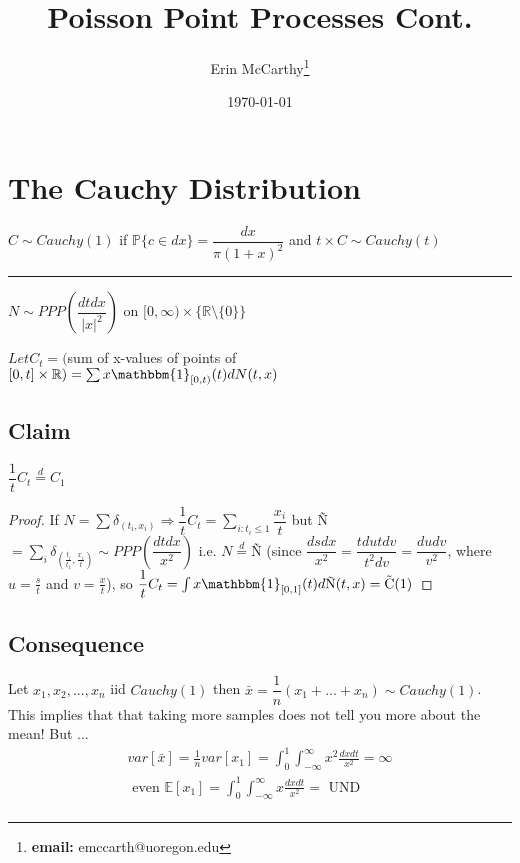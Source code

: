 \documentclass[12pt]{article}
\title{Poisson Point Processes Cont.}
\author{Erin McCarthy\thanks{\textbf{email:} emccarth@uoregon.edu}}
\date{\today}
\begin{document}
\maketitle

\section{The Cauchy Distribution}

$C \sim Cauchy(1)$ 
if $\mathbb{P}\{c \in dx\}= \dfrac{dx}{\pi(1+x)^2}$ and $t \times C \sim Cauchy(t)$

\noindent\rule{4cm}{0.4pt} 

\noindent$N \sim PPP(\dfrac{dtdx}{|x|^2})$ on $[0,\infty) \times \{ \mathbb{R}\setminus \{0\}\}$

\noindent$Let C_t = ($sum of x-values of points of $[0,t] \times \mathbb{R})= \sum x \mathbbm{1}_{[0,t)}(t) dN(t,x)$ 

\subsection*{Claim}
$\dfrac{1}{t} C_t \stackrel{d}{=} C_1$

\begin{proof}
If $N = \sum \delta_{(t_i,x_i)} \Rightarrow \dfrac{1}{t} C_t = \sum_{i:t_i\leq1} \dfrac{x_i}{t}$ but \~N $= \sum_i \delta_{\left(\frac{t_i}{t_1}, \frac{x_i}{t}\right)} \sim PPP(\dfrac{dtdx}{x^2})$ i.e. $N \stackrel{d}{=} $\~N
(since $\dfrac{dsdx}{x^2} = \dfrac{tdu tdv}{t^2dv}=\dfrac{dudv}{v^2}$, where $u=\frac{s}{t}$ and $v=\frac{x}{t}$), so $\dfrac{1}{t}C_t = \int x \mathbbm{1}_{[0,1]}(t) d\text{\~{N}} (t,x) = \text{\~C}(1)$ 
\end{proof}


\subsection*{Consequence}
Let $x_1,x_2,...,x_n$ iid $Cauchy(1)$ then $\bar{x} = \dfrac{1}{n} (x_1+...+x_n) \sim Cauchy(1)$. This implies that that taking more samples does not tell you more about the mean! But ...\\
$$\begin{aligned}
var[\bar{x}] = \frac{1}{n}var[x_1] = \int_0^1 \int_{-\infty}^{\infty} x^2 \frac{dxdt}{x^2} = \infty \\ \text{ even } \mathbb{E}[x_1]=\int_0^1\int_{-\infty}^\infty x \frac{dxdt}{x^2} = \text{ UND }\\
\end{aligned}$$
\end{document}
